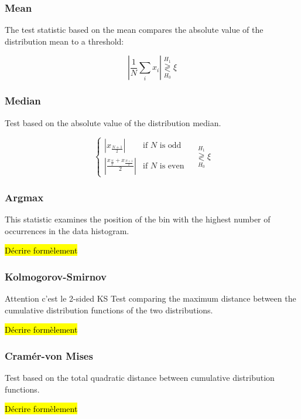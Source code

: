 \documentclass{article}
\newcommand{\dm}[1]{{\color{mulberry} #1}}
\begin{document}
\subsubsection{Mean}

The test statistic based on the mean compares the absolute value of the distribution mean to a threshold:

\begin{equation}
    \left|\frac{1}{N}\sum_i x_i \right| \stackrel{H_1}{\underset{H_0}{\gtrless}} \xi
\end{equation}

\subsubsection{Median}
Test based on the absolute value of the distribution median.

\begin{equation}
\begin{cases}
\left| x_{\frac{N+1}{2}} \right| & \text{if }N\text{ is odd} \\
\left| \frac{x_{\frac{N}{2}} + x_{\frac{N+1}{2}}}{2} \right|  & \text{if }N\text{ is even}
\end{cases}
\quad\stackrel{H_1}{\underset{H_0}{\gtrless}} \xi
\end{equation}

\subsubsection{Argmax}
This statistic examines the position of the bin with the highest number of occurrences in the data histogram.

\hl{Décrire formèlement}

\subsubsection{Kolmogorov-Smirnov}
\dm{Attention c'est le 2-sided KS}
Test comparing the maximum distance between the cumulative distribution functions of the two distributions.

\hl{Décrire formèlement}

\subsubsection{Cramér-von Mises}
Test based on the total quadratic distance between cumulative distribution functions.

\hl{Décrire formèlement}
\end{document}
